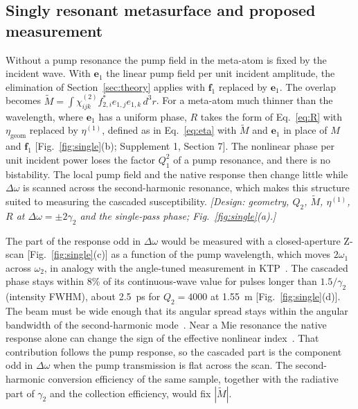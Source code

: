 \documentclass{optica-article}
\newcommand{\chitwo}{\chi^{(2)}}
\newcommand{\Dom}{\Delta\omega}
\newcommand{\etag}{\eta_{\mathrm{geom}}}
\newcommand{\f}{\mathbf f}
\begin{document}
\subsection{Singly resonant metasurface and proposed measurement}\label{sec:single}

Without a pump resonance the pump field in the meta-atom is fixed by the
incident wave.  With $\mathbf e_1$ the linear pump field per unit incident
amplitude, the elimination of Section~\ref{sec:theory} applies with $\f_1$
replaced by $\mathbf e_1$.  The overlap becomes
$\widetilde M=\int\chitwo_{ijk}f^*_{2,i}e_{1,j}e_{1,k}\,d^3r$.  For a
meta-atom much thinner than the wavelength, where $\mathbf e_1$ has a
uniform phase, $R$ takes the form of Eq.~\eqref{eq:R} with $\etag$ replaced
by $\eta^{(1)}$, defined as in Eq.~\eqref{eq:eta} with $\widetilde M$ and
$\mathbf e_1$ in place of $M$ and $\f_1$ [Fig.~\ref{fig:single}(b);
Supplement 1, Section 7].  The
nonlinear phase per unit incident power loses the factor $Q_1^2$ of a pump
resonance, and there is no bistability.  The local pump field and the
native response then change little while $\Dom$ is scanned across the
second-harmonic resonance, which makes this structure suited to measuring
the cascaded susceptibility.
\textit{[Design: geometry, $Q_2$, $\widetilde M$, $\eta^{(1)}$, $R$ at
$\Dom=\pm2\gamma_2$ and the single-pass phase; Fig.~\ref{fig:single}(a).]}

The part of the response odd in $\Dom$ would be measured with a
closed-aperture Z-scan [Fig.~\ref{fig:single}(c)] as a function of the pump
wavelength, which moves $2\omega_1$ across $\omega_2$, in analogy with the
angle-tuned measurement in KTP~\cite{desalvo1992}.  The cascaded phase stays
within 8\% of its continuous-wave value for pulses longer than
$1.5/\gamma_2$ (intensity FWHM), about 2.5~ps for $Q_2=4000$ at
1.55~\textmu m [Fig.~\ref{fig:single}(d)].  The beam must be wide enough
that its angular spread stays within the angular bandwidth of the
second-harmonic mode~\cite{overvig2022}.  Near a Mie resonance the native
response alone can change the sign of the effective nonlinear
index~\cite{panov2020}.  That contribution follows the pump response,
so the cascaded part is the component odd in $\Dom$ when the pump
transmission is flat across the scan.  The second-harmonic conversion efficiency of the
same sample, together with the radiative part of $\gamma_2$ and the
collection efficiency, would fix $|\widetilde M|$.
\end{document}
